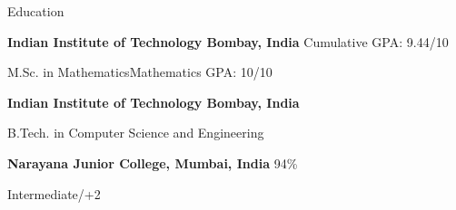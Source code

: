 
\begin{rubric}{Education}

\entry*[2024 -- Present]%
	\textbf{Indian Institute of Technology Bombay, India} \hfill Cumulative GPA: 9.44/10
	\par M.Sc. in Mathematics\hfill Mathematics GPA: 10/10

\entry*[2020 -- 2024]%
	\textbf{Indian Institute of Technology Bombay, India} \hfill 
	\par B.Tech. in Computer Science and Engineering


\entry*[2018 -- 2020]%
	\textbf{Narayana Junior College, Mumbai, India} \hfill 94\% \par
	Intermediate/+2
\end{rubric}